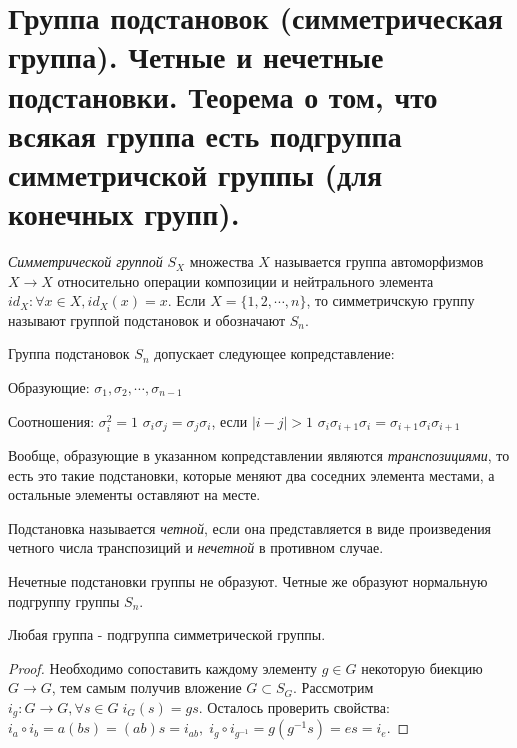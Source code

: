 \section{Группа подстановок (симметрическая группа). Четные и нечетные подстановки. 
Теорема о том, что всякая группа есть подгруппа симметричской группы (для конечных групп).}

\begin{defn} 
  \emph{Симметрической группой} $ S_{X} $ множества $ X $ называется группа автоморфизмов $ X \rightarrow X $
  относительно операции композиции и нейтрального элемента $ id_{X} : \forall x \in X, id_{X}(x) = x $. \newline
  Если $ X = \{1, 2, \cdots, n \} $, то симметричскую группу называют группой подстановок и обозначают $ S_{n} $. 
\end{defn}

Группа подстановок $ S_{n} $ допускает следующее копредставление: \newline

Образующие: \newline
$ \sigma_{1}, \sigma_{2}, \cdots ,\sigma_{n-1} $ \newline

Соотношения: \newline
$ \sigma_{i}^{2} = 1 $ \newline
$ \sigma_{i}\sigma_{j} = \sigma_{j}\sigma_{i} $, если $ |i - j| > 1 $ \newline
$ \sigma_{i}\sigma_{i+1}\sigma_{i} = \sigma_{i+1}\sigma_{i}\sigma_{i+1} $ \newline

Вообще, образующие в указанном копредставлении являются \emph{транспозициями}, то есть это такие подстановки,
которые меняют два соседних элемента местами, а остальные элементы оставляют на месте.

\begin{defn}
  Подстановка называется \emph{четной}, если она представляется в виде произведения четного числа транспозиций и 
  \emph{нечетной} в противном случае.
\end{defn}

Нечетные подстановки группы не образуют. Четные же образуют нормальную подгруппу группы $ S_n $.

\begin{thm}
  Любая группа - подгруппа симметрической группы.
\end{thm}
\begin{proof}
  Необходимо сопоставить каждому элементу $ g \in G $ некоторую биекцию $ G \rightarrow G $, тем самым получив вложение $ G \subset S_{G} $.
  Рассмотрим $ i_{g} : G \rightarrow G, \forall s \in G \; i_{G}(s) = gs $. 
  Осталось проверить свойства: $ i_{a} \circ i_{b} = a(bs) = (ab)s = i_{ab}, \; i_{g} \circ i_{g^{-1}} = g(g^{-1}s) = es = i_{e} $.
\end{proof}

